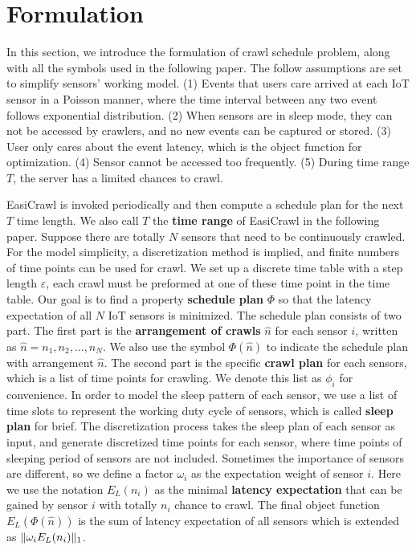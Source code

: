 \documentclass[conference]{IEEEtran}
\begin{document}
\section{Formulation}\label{formulation}

In this section, we introduce the formulation of crawl schedule problem, along with all the symbols used in the following paper. The follow assumptions are set to simplify sensors' working model.
(1) Events that users care arrived at each IoT sensor in a Poisson manner, where the time interval between any two event follows exponential distribution. 
(2) When sensors are in sleep mode, they can not be accessed by crawlers, and no new events can be captured or stored.
(3) User only cares about the event latency, which is the object function for optimization.
(4) Sensor cannot be accessed too frequently.
(5) During time range $T$, the server has a limited chances to crawl.

EasiCrawl is invoked periodically and then compute a schedule plan for the next $T$ time length.
We also call $T$ the \textbf{time range} of EasiCrawl in the following paper.
Suppose there are totally $N$ sensors that need to be continuously crawled.
For the model simplicity, a discretization method is implied, and finite numbers of time points can be used for crawl.
We set up a discrete time table with a step length $\varepsilon$, each crawl must be preformed at one of these time point in the time table.
Our goal is to find a property \textbf{schedule plan} $\Phi$ so that the latency expectation of all $N$ IoT sensors is minimized. 
The schedule plan consists of two part. The first part is the \textbf{arrangement of crawls} $\hat{n}$ for each sensor $i$, written as $\hat{n}=n_1,n_2,\ldots,n_{N}$. We also use the symbol $\Phi(\hat{n})$ to indicate the schedule plan with arrangement $\hat{n}$.
The second part is the specific \textbf{crawl plan} for each sensors, which is a list of time points for crawling. We denote this list as $\phi_{i}$ for convenience.
In order to model the sleep pattern of each sensor, we use a list of time slots to represent the working duty cycle of sensors, which is called \textbf{sleep plan} for brief. 
The discretization process takes the sleep plan of each sensor as input, and generate discretized time points for each sensor, where time points of sleeping period of sensors are not included.
Sometimes the importance of sensors are different, so we define a factor $\omega_i$ as the expectation weight of sensor $i$. 
Here we use the notation $E_{L}(n_{i})$ as the minimal \textbf{latency expectation} that can be gained by sensor $i$ with totally $n_i$ chance to crawl.
The final object function $E_L(\Phi(\hat{n}))$ is the sum of latency expectation of all sensors which is extended as $\Arrowvert \omega_i E_{L}(n_{i}) \Arrowvert_{1}$.
\end{document}
